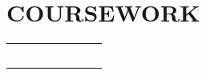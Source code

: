 \newcommand{\courseSubjects}[4]{
  \item
    \begin{tabular*}{0.97\textwidth}{@{\extracolsep{\fill}}lcl}
      \text{#1} & ~~~~~~~~~~~\text{#2} \\ 
      \text{#3} & \text{#4} \\
    \end{tabular*}
}

% 
\vspace{-2pt}
\section{\large \textbf{COURSEWORK}}
    \resumeSubHeadingListStart
        \courseSubjects
        {Object Oriented Programming (OOP)}
        {Operating System (OS)}
        {Data Base Management System (DBMS)}
        {System Design}
    \resumeSubHeadingListEnd